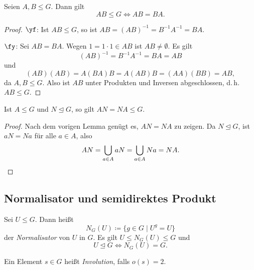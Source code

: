 \documentclass[11pt]{article}
\begin{document}
\begin{ergaenzung}

\begin{lemma}\Theorem
  Seien $A, B \le G$. Dann gilt
  \[ AB \le G \iff AB = BA. \]
\end{lemma}

\begin{proof}
  \glqq$\yf$\grqq: Ist $AB \le G$, so ist $AB = (AB)^{-1} = B^{-1}A^{-1} = BA$.

  \glqq$\fy$\grqq: Sei $AB = BA$. Wegen $1 = 1 \cdot 1 \in AB$ ist $AB \neq \emptyset$. Es gilt
  \[ (AB)^{-1} = B^{-1}A^{-1} = BA = AB \]
  und
  \[ (AB)(AB) = A(BA)B = A(AB)B = (AA)(BB) = AB, \]
  da $A, B \le G$. Also ist $AB$ unter Produkten und Inversen abgeschlossen, d.\,h. $AB \le G$.
\end{proof}

\begin{lemma}
  Ist $A \le G$ und $N \trianglelefteq G$, so gilt $AN = NA \le G$.
\end{lemma}

\begin{proof}
  Nach dem vorigen Lemma genügt es, $AN = NA$ zu zeigen. Da $N \trianglelefteq G$, ist $aN = Na$ für alle $a \in A$, also
  \[ AN = \bigcup_{a \in A} aN = \bigcup_{a \in A} Na = NA. \qedhere \]
\end{proof}
\end{ergaenzung}


\subsection{Normalisator und semidirektes Produkt}

\begin{ergaenzung}
\begin{definition}[Normalisator]\Theorem
  Sei $U \le G$. Dann heißt
  \[ N_G(U) \coloneqq \{g \in G \mid U^g = U\} \]
  der \emph{Normalisator} von $U$ in $G$. Es gilt $U \le N_G(U) \le G$ und
  \[ U \trianglelefteq G \iff N_G(U) = G. \]
\end{definition}

\begin{definition}[Involution]\Theorem
  Ein Element $s \in G$ heißt \emph{Involution}, falls $o(s) = 2$.
\end{definition}
\end{ergaenzung}
\end{document}
